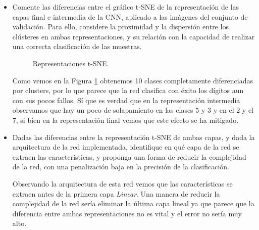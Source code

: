 \documentclass[12pt]{scrartcl}
\begin{document}
\begin{itemize}
    \item Comente las diferencias entre el gráfico t-SNE de la representación de las capas final e intermedia de la CNN, aplicado a las imágenes del conjunto de validación. Para ello, considere la proximidad y la dispersión entre los clústeres en ambas representaciones, y su relación con la capacidad de realizar una correcta clasificación de las muestras.
    \begin{figure}[H]
        \centering
        \caption{Representaciones t-SNE.}
        \label{fig:tsne1}
    \end{figure}
    
    Como vemos en la Figura \ref{fig:tsne1} obtenemos 10 clases completamente diferenciadas por clusters, por lo que parece que la red clasifica con éxito los dígitos aun con sus pocos fallos.
    Sí que es verdad que en la representación intermedia observamos que hay un poco de solapamiento en las clases $5$ y $3$ y en el $2$ y el $7$, si bien en la representación final vemos que 
    este efecto se ha mitigado.
    
    \item Dadas las diferencias entre la representación t-SNE de ambas capas, y dada la arquitectura de la red implementada, identifique en qué capa de la red se extraen las características, y proponga una forma de reducir la complejidad de la red, con una penalización baja en la precisión de la clasificación.
    
    Observando la arquitectura de esta red vemos que las características se extraen antes de la primera capa \emph{Linear}. Una manera de reducir la complejidad de la red sería eliminar la última capa lineal ya que parece que la diferencia entre ambas representaciones no es vital y el error no sería muy alto.
    
    \end{itemize}
    
\end{document}
